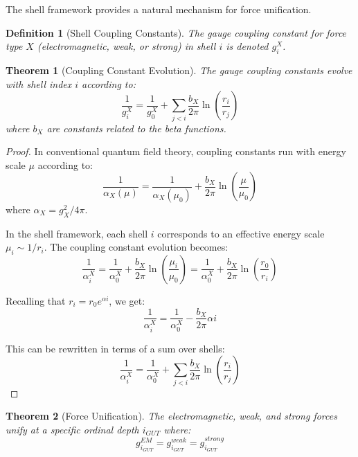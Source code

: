 \documentclass[12pt,a4paper]{article}
\newtheorem{theorem}{Theorem}[section]
\newtheorem{definition}{Definition}[section]
\begin{document}
The shell framework provides a natural mechanism for force unification.

\begin{definition}[Shell Coupling Constants]
\label{def:coupling-constants}
The gauge coupling constant for force type $X$ (electromagnetic, weak, or strong) in shell $i$ is denoted $g_i^X$.
\end{definition}

\begin{theorem}[Coupling Constant Evolution]
\label{thm:coupling-evolution}
The gauge coupling constants evolve with shell index $i$ according to:
\begin{equation}
\frac{1}{g_i^X} = \frac{1}{g_0^X} + \sum_{j < i} \frac{b_X}{2\pi} \ln\left(\frac{r_i}{r_j}\right)
\end{equation}
where $b_X$ are constants related to the beta functions.
\end{theorem}

\begin{proof}
In conventional quantum field theory, coupling constants run with energy scale $\mu$ according to:
\begin{equation}
\frac{1}{\alpha_X(\mu)} = \frac{1}{\alpha_X(\mu_0)} + \frac{b_X}{2\pi} \ln\left(\frac{\mu}{\mu_0}\right)
\end{equation}
where $\alpha_X = g_X^2/4\pi$.

In the shell framework, each shell $i$ corresponds to an effective energy scale $\mu_i \sim 1/r_i$. The coupling constant evolution becomes:
\begin{equation}
\frac{1}{\alpha_i^X} = \frac{1}{\alpha_0^X} + \frac{b_X}{2\pi} \ln\left(\frac{\mu_i}{\mu_0}\right) = \frac{1}{\alpha_0^X} + \frac{b_X}{2\pi} \ln\left(\frac{r_0}{r_i}\right)
\end{equation}

Recalling that $r_i = r_0 e^{\alpha i}$, we get:
\begin{equation}
\frac{1}{\alpha_i^X} = \frac{1}{\alpha_0^X} - \frac{b_X}{2\pi} \alpha i
\end{equation}

This can be rewritten in terms of a sum over shells:
\begin{equation}
\frac{1}{\alpha_i^X} = \frac{1}{\alpha_0^X} + \sum_{j < i} \frac{b_X}{2\pi} \ln\left(\frac{r_i}{r_j}\right)
\end{equation}
\end{proof}

\begin{theorem}[Force Unification]
\label{thm:force-unification}
The electromagnetic, weak, and strong forces unify at a specific ordinal depth $i_{GUT}$ where:
\begin{equation}
g_{i_{GUT}}^{EM} = g_{i_{GUT}}^{weak} = g_{i_{GUT}}^{strong}
\end{equation}
\end{theorem}
\end{document}
